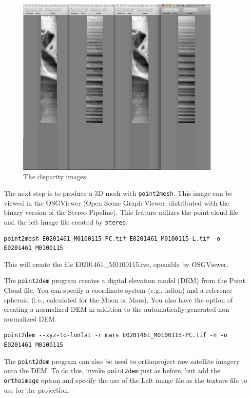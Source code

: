 \begin{figure}
\begin{center}
\includegraphics[width=4in]{images/p19-disparity.png}
\caption[P19 disparity images]{
    \label{p19-disparity}
	The disparity images.
    }
\end{center}
\end{figure}

The next step is to produce a 3D mesh with \texttt{point2mesh}.
This image can be viewed in the OSGViewer (Open Scene Graph Viewer,
distributed with the binary version of the Stereo Pipeline). This
feature utilizes the point cloud file and the left image file created
by \texttt{stereo}.

\begin{verbatim}
point2mesh E0201461_M0100115-PC.tif E0201461_M0100115-L.tif -o E0201461_M0100115
\end{verbatim}

This will create the file E0201461\_M0100115.ive, openable by OSGViewer.

The \texttt{point2dem} program creates a digital elevation model
(DEM) from the Point Cloud file.  You can specify a coordinate
system (e.g., latlon) and a reference spheroid (i.e., calculated
for the Moon or Mars). You also have the option of creating a
normalized DEM in addition to the automatically generated non-normalized
DEM.

\begin{verbatim}
point2dem --xyz-to-lonlat -r mars E0201461_M0100115-PC.tif -n -o E0201461_M0100115
\end{verbatim}

The \texttt{point2dem} program can also be used to orthoproject raw
satellite imagery onto the DEM. To do this, invoke \texttt{point2dem}
just as before, but add the \texttt{orthoimage} option and specify
the use of the Left image file as the texture file to use for the
projection.

